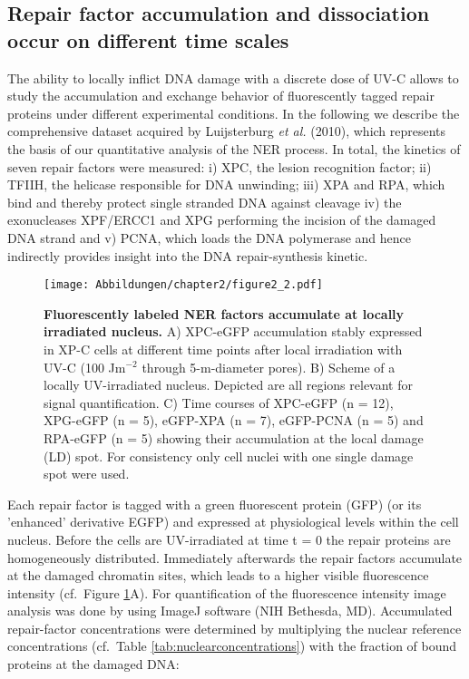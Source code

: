 \subsection{Repair factor accumulation and dissociation occur on different time scales}
\label{subsec:AccuFlipExp}
The ability to locally inflict DNA damage with a discrete dose of UV-C allows to study the accumulation and exchange behavior of fluorescently tagged repair proteins under different experimental conditions. In the following we describe the comprehensive dataset acquired by Luijsterburg \textit{et al.} (2010)\cite{Luijsterburg2010}, which represents the basis of our quantitative analysis of the NER process. In total, the kinetics of seven repair factors were measured: i) XPC, the lesion recognition factor; ii) TFIIH, the helicase responsible for DNA unwinding; iii) XPA and RPA, which bind and thereby protect single stranded DNA against cleavage iv) the exonucleases XPF/ERCC1 and XPG performing the incision of the damaged DNA strand and v) PCNA, which loads the DNA polymerase and hence indirectly provides insight into the DNA repair-synthesis kinetic. \\
\begin{figure}[htbp]
\begin{center}
\texttt{[image: Abbildungen/chapter2/figure2\_2.pdf]}
\caption{\textbf{Fluorescently labeled NER factors accumulate at locally irradiated nucleus.} A) XPC-eGFP accumulation stably expressed in XP-C cells at different time points after local irradiation with UV-C (100 J$\text{m}^{-\text{2}}$ through 5-\textmu m-diameter pores). B) Scheme of a locally UV-irradiated nucleus. Depicted are all regions relevant for signal quantification. C) Time courses of XPC-eGFP (n = 12), XPG-eGFP (n = 5), eGFP-XPA (n = 7), eGFP-PCNA (n = 5) and RPA-eGFP (n = 5) showing their accumulation at the local damage (LD) spot. For consistency only cell nuclei with one single damage spot were used.}
\label{fig:accuImage}
\end{center}
\end{figure} 
\noindent Each repair factor is tagged with a green fluorescent protein (GFP) (or its 'enhanced' derivative EGFP) and expressed at physiological levels within the cell nucleus. Before the cells are UV-irradiated at time t = 0 the repair proteins are homogeneously distributed. Immediately afterwards the repair factors accumulate at the damaged chromatin sites, which leads to a higher visible fluorescence intensity (cf.\ Figure \ref{fig:accuImage}A). For quantification of the fluorescence intensity image analysis was done by using ImageJ software (NIH Bethesda, MD). Accumulated repair-factor concentrations were determined by multiplying the nuclear reference concentrations (cf.\ Table \ref{tab:nuclearconcentrations}) with the fraction of bound proteins at the damaged DNA:
